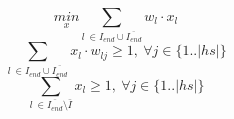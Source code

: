 \documentclass{article}
\newcommand\Iend{\ensuremath{I_\mathit{end} }\xspace}
\begin{document}
\begin{equation} \label{eq:ILP:objective}
  \underset{x}{min} \sum_{ l\  \in  \Iend \cup \overline{\Iend}} w_l \cdot x_l
\end{equation}
\begin{equation} \label{eq:ILP:hittingset}
  \sum_{ l\  \in  \Iend \cup \overline{\Iend}} x_l \cdot w_{lj} \geq 1, \  \forall j \in \{1..|hs|\}
\end{equation}
\begin{equation} \label{eq:ILP:hittingset}
  \sum_{ l\  \in \overline{\Iend} \setminus \bar{I}} x_l \geq 1, \  \forall j \in \{1..|hs|\}
\end{equation}

\end{document}
